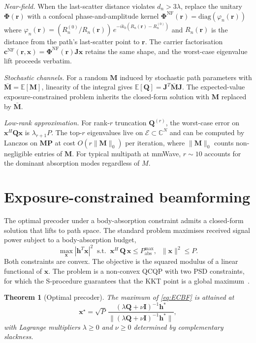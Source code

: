 \documentclass[journal,twocolumn,10pt]{IEEEtran}
\theoremstyle{plain}
\newtheorem{theorem}{Theorem}
\theoremstyle{remark}
\newcommand{\rr}{\mathbf{r}}
\newcommand{\xx}{\mathbf{x}}
\newcommand{\hh}{\mathbf{h}}
\newcommand{\Qmat}{\mathbf{Q}}
\newcommand{\Mmat}{\mathbf{M}}
\newcommand{\Jmat}{\mathbf{J}}
\newcommand{\Pmat}{\mathbf{P}}
\newcommand{\Phimat}{\mathbf{\Phi}}
\newcommand{\Complex}{\mathbb{C}}
\begin{document}
\emph{Near-field.} When the last-scatter distance violates
$d_n > 3\lambda$, replace the unitary $\Phimat(\rr)$ with a confocal
phase-and-amplitude kernel $\Phimat^{\mathrm{NF}}(\rr) =
\mathrm{diag}(\varphi_n(\rr))$ where $\varphi_n(\rr) =
(R_n^{(0)}/R_n(\rr))\,e^{-i k_0 (R_n(\rr) - R_n^{(0)})}$ and
$R_n(\rr)$ is the distance from the path's last-scatter point to
$\rr$. The carrier factorisation
$\mathbf{c}^{\mathrm{NF}}(\rr, \xx) = \Phimat^{\mathrm{NF}}(\rr)
\Jmat \xx$ retains the same shape, and the worst-case eigenvalue
lift proceeds verbatim.

\emph{Stochastic channels.} For a random $\Mmat$ induced by
stochastic path parameters with $\bar{\Mmat} = \mathbb{E}[\Mmat]$,
linearity of the integral gives $\mathbb{E}[\Qmat] = \Jmat^T
\bar{\Mmat} \Jmat$. The expected-value exposure-constrained problem
inherits the closed-form solution with $\Mmat$ replaced by
$\bar{\Mmat}$.

\emph{Low-rank approximation.} For rank-$r$ truncation $\Qmat^{(r)}$,
the worst-case error on $\xx^H \Qmat \xx$ is $\lambda_{r+1} P$. The
top-$r$ eigenvalues live on $\mathcal{E} \subset \Complex^N$ and can
be computed by Lanczos on $\Mmat \Pmat$ at cost $O(r \|\Mmat\|_0)$
per iteration, where $\|\Mmat\|_0$ counts non-negligible entries of
$\Mmat$. For typical multipath at mmWave, $r \sim 10$ accounts for
the dominant absorption modes regardless of $M$.


\section{Exposure-constrained beamforming}\label{sec:ecbf}

The optimal precoder under a body-absorption constraint admits a
closed-form solution that lifts to path space. The standard problem
maximises received signal power subject to a body-absorption budget,
\begin{equation}\label{eq:ECBF}
  \max_\xx |\hh^T \xx|^2
  \;\;\text{s.t.}\;\;
  \xx^H\,\Qmat\,\xx \leq P_{\mathrm{abs}}^{\max},
  \;\;\|\xx\|^2 \leq P.
\end{equation}
Both constraints are convex. The objective is the squared modulus of
a linear functional of $\xx$. The problem is a non-convex QCQP with
two PSD constraints, for which the S-procedure guarantees that the
KKT point is a global maximum~\cite{BoydVandenberghe2004,Ying2015}.

\begin{theorem}[Optimal precoder]\label{thm:ecbf}
The maximum of \cref{eq:ECBF} is attained at
\begin{equation}\label{eq:x-opt}
  \xx^\star = \sqrt{P}\,
  \frac{(\lambda \Qmat + \nu \mathbf{I})^{-1} \hh^*}
  {\|(\lambda \Qmat + \nu \mathbf{I})^{-1} \hh^*\|},
\end{equation}
with Lagrange multipliers $\lambda \geq 0$ and $\nu \geq 0$
determined by complementary slackness.
\end{theorem}
\end{document}
